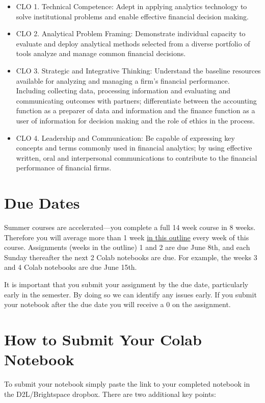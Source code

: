 \documentclass[11pt]{article}
\begin{document}
\begin{itemize}
\item CLO 1. Technical Competence: Adept in applying analytics technology to solve institutional problems and enable effective financial decision making.
\item CLO 2. Analytical Problem Framing: Demonstrate individual capacity to evaluate and deploy analytical methods selected from a diverse portfolio of tools analyze and manage common financial decisions.
\item CLO 3. Strategic and Integrative Thinking: Understand the baseline resources available for analyzing and managing a firm’s financial performance. Including collecting data, processing information and evaluating and communicating outcomes with partners; differentiate between the accounting function as a preparer of data and information and the finance function as a user of information for decision making and the role of ethics in the process.
\item CLO 4. Leadership and Communication: Be capable of expressing key concepts and terms commonly used in financial analytics; by using effective written, oral and interpersonal communications to contribute to the financial performance of financial firms.
\end{itemize}
\section{Due Dates}
\label{sec:orgf6dbfd9}


Summer courses are accelerated---you complete a full 14 week course in 8 weeks.  Therefore you will average more than 1 week \href{https://financial-education.github.io/python\_for\_finance\_outline/}{in this outline} every week of this course.  Assignments (weeks in the outline) 1 and 2 are due June 8th, and each Sunday thereafter the next 2 Colab notebooks are due.  For example, the weeks 3 and 4 Colab notebooks are due June 15th.

It is important that you submit your assignment by the due date, particularly early in the semester.  By doing so we can identify any issues early.  If you submit your notebook after the due date you will receive a 0 on the assignment.
\section{How to Submit Your Colab Notebook}
\label{sec:org4e725f4}

To submit your notebook simply paste the link to your completed notebook in the D2L/Brightspace dropbox.  There are two additional key points:
\end{document}
